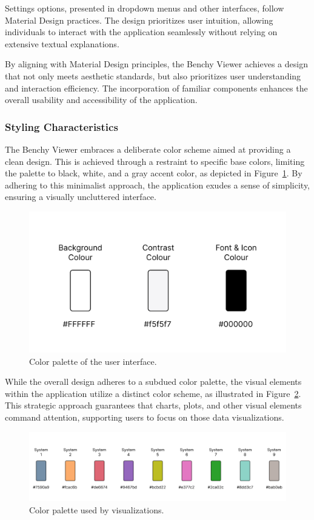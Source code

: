 Settings options, presented in dropdown menus and other interfaces, follow Material Design practices. The design prioritizes user intuition, allowing individuals to interact with the application seamlessly without relying on extensive textual explanations.

By aligning with Material Design principles, the Benchy Viewer achieves a design that not only meets aesthetic standards, but also prioritizes user understanding and interaction efficiency. The incorporation of familiar components enhances the overall usability and accessibility of the application.


\subsubsection{Styling Characteristics}

The Benchy Viewer embraces a deliberate color scheme aimed at providing a clean design. This is achieved through a restraint to specific base colors, limiting the palette to black, white, and a gray accent color, as depicted in Figure~\ref{fig:colors}. By adhering to this minimalist approach, the application exudes a sense of simplicity, ensuring a visually uncluttered interface.



\begin{figure}[h]
  \centering
  \includegraphics[width=0.4\linewidth]{figures/colors.png}
  \caption{Color palette of the user interface.}
  \label{fig:colors}
\end{figure}

While the overall design adheres to a subdued color palette, the visual elements within the application utilize a distinct color scheme, as illustrated in Figure~\ref{fig:colors-dbms}. This strategic approach guarantees that charts, plots, and other visual elements command attention, supporting users to focus on those data visualizations.

\begin{figure}[h]
  \centering
  \includegraphics[width=1\linewidth]{figures/colors-dbms.png}
  \caption{Color palette used by visualizations.}
  \label{fig:colors-dbms}
\end{figure}

